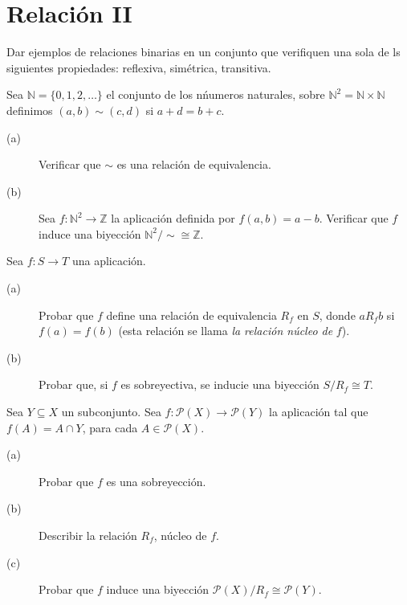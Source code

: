 \section{Relación II}

\begin{ejercicio}
    Dar ejemplos de relaciones binarias en un conjunto que verifiquen una sola de ls siguientes propiedades: reflexiva, simétrica, transitiva.
\end{ejercicio}

\begin{ejercicio}
    Sea $\mathbb{N} = \{0,1,2, \ldots\}$ el conjunto de los nńumeros naturales, sobre $\mathbb{N}^2 = \mathbb{N}\times \mathbb{N}$ definimos $(a,b)\sim (c,d)$ si $a+d=b+c$.
    \begin{description}
        \item [(a)] Verificar que $\sim$ es una relación de equivalencia.
        \item [(b)] Sea $f:\mathbb{N}^2\to \mathbb{Z}$ la aplicación definida por $f(a,b)=a-b$. Verificar que $f$ induce una biyección $\mathbb{N}^2 /\sim \cong \mathbb{Z}$.
    \end{description}
\end{ejercicio}

\begin{ejercicio}
    Sea $f:S\to T$ una aplicación.
    \begin{description}
        \item [(a)] Probar que $f$ define una relación de equivalencia $R_f$ en $S$, donde $aR_f b$ si $f(a) = f(b)$ (esta relación se llama \emph{la relación núcleo de} $f$).
        \item [(b)] Probar que, si $f$ es sobreyectiva, se inducie una biyección $S/R_f\cong T$.
    \end{description}
\end{ejercicio}

\begin{ejercicio}
    Sea $Y\subseteq X$ un subconjunto. Sea $f:\mathcal{P}(X)\to \mathcal{P}(Y)$ la aplicación tal que $f(A) = A\cap Y$, para cada $A\in \mathcal{P}(X)$.
    \begin{description}
        \item [(a)] Probar que $f$ es una sobreyección.
        \item [(b)] Describir la relación $R_f$, núcleo de $f$.
        \item [(c)] Probar que $f$ induce una biyección $\mathcal{P}(X)/R_f\cong \mathcal{P}(Y)$.
    \end{description}
\end{ejercicio}

